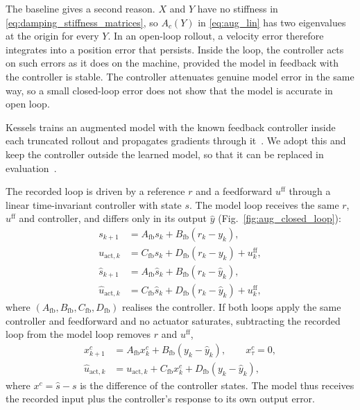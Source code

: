 The baseline gives a second reason.
$X$ and $Y$ have no stiffness in \eqref{eq:damping_stiffness_matrices}, so
$A_c(Y)$ in \eqref{eq:aug_lin} has two eigenvalues at the origin for every
$Y$.
In an open-loop rollout, a velocity error therefore integrates into a
position error that persists.
Inside the loop, the controller acts on such errors as it does on the
machine, provided the model in feedback with the controller is stable.
The controller attenuates genuine model error in the same way, so a small
closed-loop error does not show that the model is accurate in open loop.

Kessels trains an augmented model with the known feedback controller inside
each truncated rollout and propagates gradients through
it~\cite[Eqs.~(5.12), (5.13c), (5.13d)]{kessels2025ai}.
We adopt this and keep the controller outside the learned model, so that it
can be replaced in evaluation~\cite[Sec.~5.3.2.3]{kessels2025ai}.

The recorded loop is driven by a reference $r$ and a feedforward
$u^{\mathrm{ff}}$ through a linear time-invariant controller with state $s$.
The model loop receives the same $r$, $u^{\mathrm{ff}}$ and controller, and
differs only in its output $\hat y$ (Fig.~\ref{fig:aug_closed_loop}):
\begin{equation}
\begin{aligned}
 s_{k+1}&=A_{\mathrm{fb}} s_k+B_{\mathrm{fb}}(r_k-y_k), \\
 u_{\mathrm{act},k}&=C_{\mathrm{fb}} s_k+D_{\mathrm{fb}}(r_k-y_k)+u^{\mathrm{ff}}_k,\\
 \hat s_{k+1}&=A_{\mathrm{fb}} \hat s_k+B_{\mathrm{fb}}(r_k-\hat y_k), \\
 \hat u_{\mathrm{act},k}&=C_{\mathrm{fb}} \hat s_k+D_{\mathrm{fb}}(r_k-\hat y_k)+u^{\mathrm{ff}}_k ,
\end{aligned}
\label{eq:aug_direct_controller}
\end{equation}
where $(A_{\mathrm{fb}},B_{\mathrm{fb}},C_{\mathrm{fb}},D_{\mathrm{fb}})$
realises the controller.
If both loops apply the same controller and feedforward and no actuator
saturates, subtracting the recorded loop from the model loop removes $r$ and
$u^{\mathrm{ff}}$,
\begin{equation}
\begin{aligned}
 x^c_{k+1}&=A_{\mathrm{fb}} x^c_k+B_{\mathrm{fb}}(y_k-\hat y_k),\qquad x^c_\tau=0,\\
 \hat u_{\mathrm{act},k}&=u_{\mathrm{act},k}+C_{\mathrm{fb}} x^c_k+D_{\mathrm{fb}}(y_k-\hat y_k),
\end{aligned}
\label{eq:aug_controller}
\end{equation}
where $x^c=\hat s-s$ is the difference of the controller states.
The model thus receives the recorded input plus the controller's response to
its own output error.

